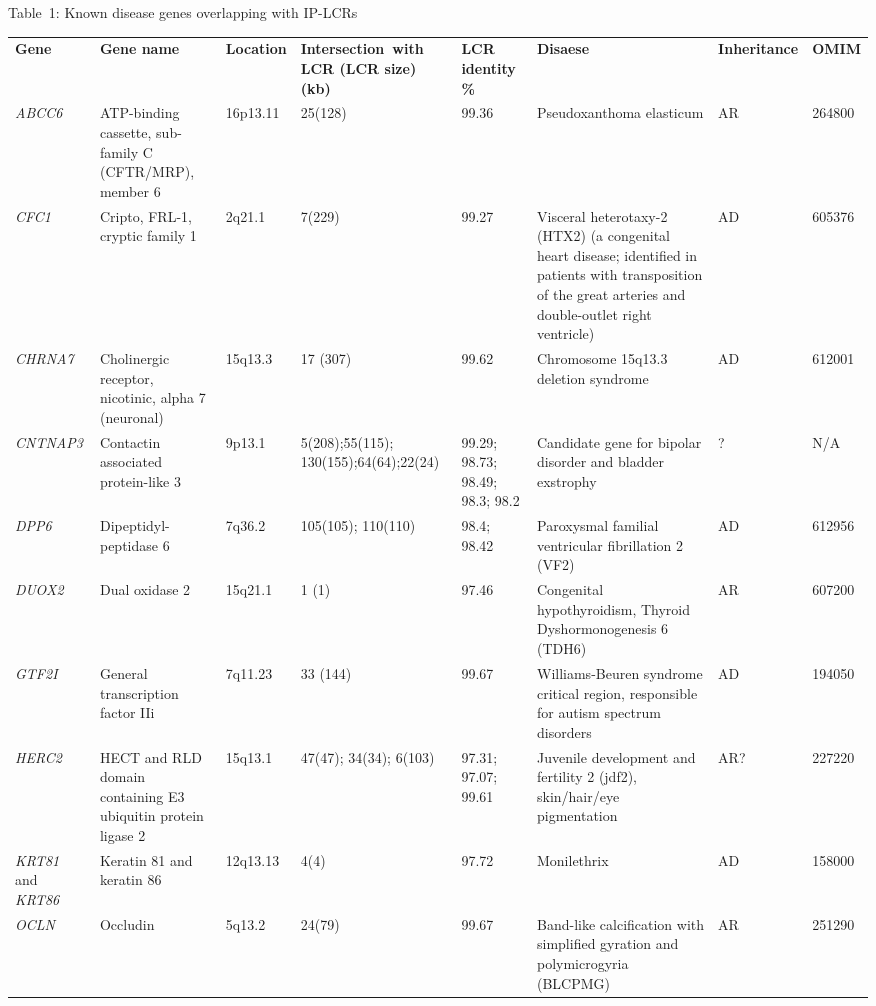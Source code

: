 \documentclass[final]{beamer}
\newlength{\twocolwid}
\begin{document}
\begin{frame}[t]
\begin{columns}[t]
\begin{column}{\twocolwid}
 \begin{table}[t!]
 \begin{center}
 \label{tab:binomial}
\small{Table~1: Known disease genes overlapping with IP-LCRs}
\begin{tiny}
 \begin{tabular}{|p{0.05\paperwidth}p{0.14\paperwidth}p{0.03\paperwidth}p{0.06\paperwidth}p{0.05\paperwidth}p{0.2\paperwidth}p{0.03\paperwidth}p{0.03\paperwidth}|}
\hline
\textbf{Gene}&\textbf{Gene name}&\textbf{Location}&\textbf{Intersection~with LCR (LCR size) (kb)}&\textbf{LCR identity \%}&\textbf{Disaese}&\textbf{Inheritance}&\textbf{OMIM}\\%
\textit{ABCC6}&ATP-binding cassette, sub-family C (CFTR/MRP), member 6 &16p13.11&25(128)&99.36&Pseudoxanthoma elasticum&AR&264800\\%
\textit{CFC1}&Cripto, FRL-1, cryptic family 1&2q21.1&7(229) &99.27&Visceral heterotaxy-2  (HTX2) (a congenital heart disease; identified in patients with transposition of the great arteries and double-outlet right ventricle)&AD&605376\\%
\textit{CHRNA7}&Cholinergic receptor, nicotinic, alpha 7 (neuronal) &15q13.3&17 (307)&99.62&Chromosome 15q13.3 deletion syndrome&AD&612001\\%
\textit{CNTNAP3}&Contactin associated protein-like 3 &9p13.1&5(208);55(115); 130(155);64(64);22(24)&99.29; 98.73; 98.49; 98.3; 98.2&Candidate gene for bipolar disorder  and bladder exstrophy&?&N/A\\%
\textit{DPP6}&Dipeptidyl-peptidase 6 &7q36.2 &105(105); 110(110)&98.4; 98.42&Paroxysmal familial ventricular fibrillation 2 (VF2)&AD&612956\\%
\textit{DUOX2}&Dual oxidase 2 &15q21.1&1 (1)&97.46&Congenital hypothyroidism, Thyroid Dyshormonogenesis 6 (TDH6)&AR&607200\\%
\textit{GTF2I}&General transcription factor IIi &7q11.23&33 (144)&99.67&Williams-Beuren syndrome critical region, responsible for autism spectrum disorders&AD&194050\\%
\textit{HERC2}&HECT and RLD domain containing E3 ubiquitin protein ligase 2 &15q13.1&47(47); 34(34); 6(103)&97.31; 97.07; 99.61&Juvenile development and fertility 2 (jdf2), skin/hair/eye pigmentation&AR?&227220\\%
\textit{KRT81} and \textit{KRT86}&Keratin 81  and keratin 86&12q13.13  &4(4)&97.72&Monilethrix&AD&158000\\%
\textit{OCLN}&Occludin &5q13.2 &24(79)&99.67&Band-like calcification with simplified gyration and polymicrogyria (BLCPMG)&AR&251290\\%

\end{tabular}
\end{tiny}
\end{center}
\end{table}
\end{column}
\end{columns}
\end{frame}
\end{document}
